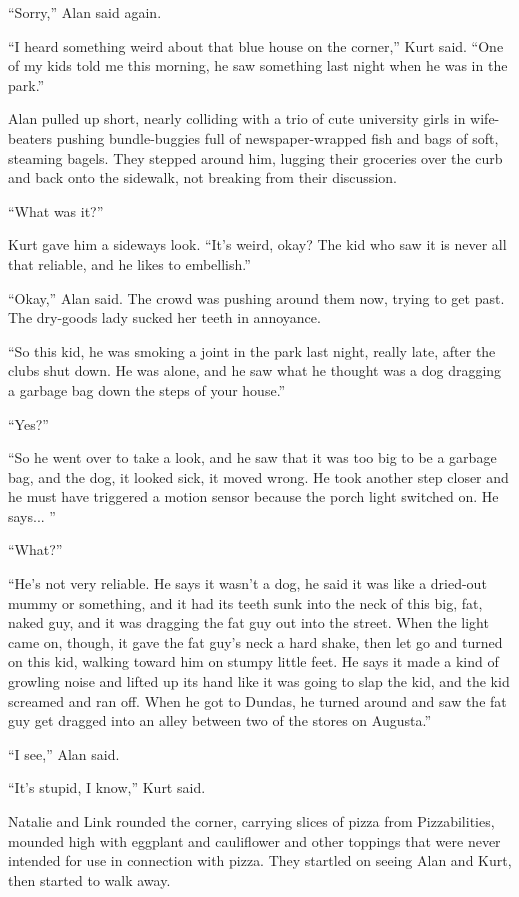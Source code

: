 \documentclass{article}
\begin{document}
``Sorry,'' Alan said again.

``I heard something weird about that blue house on the corner,'' Kurt
said.  ``One of my kids told me this morning, he saw something last
night when he was in the park.''

Alan pulled up short, nearly colliding with a trio of cute university
girls in wife-beaters pushing bundle-buggies full of newspaper-wrapped
fish and bags of soft, steaming bagels.  They stepped around him,
lugging their groceries over the curb and back onto the sidewalk, not
breaking from their discussion.

``What was it?''

Kurt gave him a sideways look.  ``It's weird, okay?  The kid who saw
it is never all that reliable, and he likes to embellish.''

``Okay,'' Alan said.  The crowd was pushing around them now, trying to
get past.  The dry-goods lady sucked her teeth in annoyance.

``So this kid, he was smoking a joint in the park last night, really
late, after the clubs shut down.  He was alone, and he saw what he
thought was a dog dragging a garbage bag down the steps of your
house.''

``Yes?''

``So he went over to take a look, and he saw that it was too big to be
a garbage bag, and the dog, it looked sick, it moved wrong.  He took
another step closer and he must have triggered a motion sensor because
the porch light switched on.  He says...  ''

``What?''

``He's not very reliable.  He says it wasn't a dog, he said it was
like a dried-out mummy or something, and it had its teeth sunk into
the neck of this big, fat, naked guy, and it was dragging the fat guy
out into the street.  When the light came on, though, it gave the fat
guy's neck a hard shake, then let go and turned on this kid, walking
toward him on stumpy little feet.  He says it made a kind of growling
noise and lifted up its hand like it was going to slap the kid, and
the kid screamed and ran off.  When he got to Dundas, he turned around
and saw the fat guy get dragged into an alley between two of the
stores on Augusta.''

``I see,'' Alan said.

``It's stupid, I know,'' Kurt said.

Natalie and Link rounded the corner, carrying slices of pizza from
Pizzabilities, mounded high with eggplant and cauliflower and other
toppings that were never intended for use in connection with pizza. 
They startled on seeing Alan and Kurt, then started to walk away.
\end{document}
